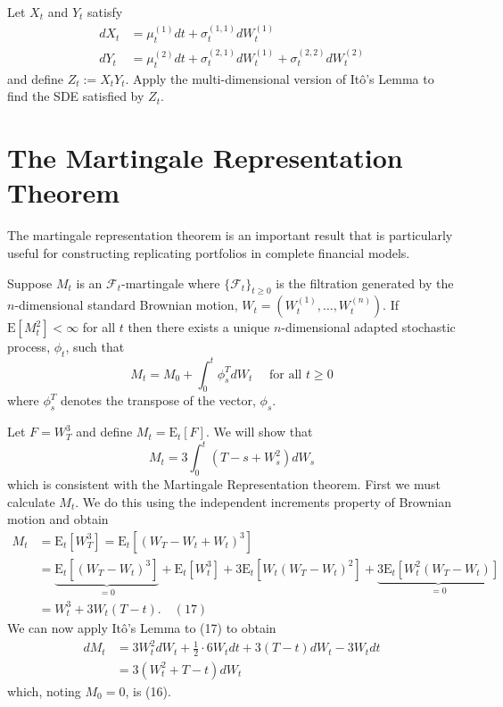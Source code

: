 \begin{example}
Let $X_t$ and $Y_t$ satisfy
\begin{align*}
dX_t &= \mu^{(1)}_t dt + \sigma^{(1,1)}_t dW^{(1)}_t \\
dY_t &= \mu^{(2)}_t dt + \sigma^{(2,1)}_t dW^{(1)}_t + \sigma^{(2,2)}_t dW^{(2)}_t
\end{align*}
and define $Z_t:=X_t Y_t$. Apply the multi-dimensional version of It\^o's Lemma to find the SDE satisfied by $Z_t$.
\end{example}

\section{The Martingale Representation Theorem}
The martingale representation theorem is an important result that is particularly useful for constructing replicating portfolios in complete financial models.

\begin{theorem}
Suppose $M_t$ is an $\mathcal{F}_t$-martingale where $\{\mathcal{F}_t\}_{t\geq 0}$ is the filtration generated by the $n$-dimensional standard Brownian motion, $W_t=(W^{(1)}_t,\ldots,W^{(n)}_t)$. If $\mathrm{E}[M_t^2]<\infty$ for all $t$ then there exists a unique $n$-dimensional adapted stochastic process, $\phi_t$, such that
\[M_t = M_0 + \int_0^t \phi_s^T dW_t \quad \text{ for all } t\geq 0\]
where $\phi_s^T$ denotes the transpose of the vector, $\phi_s$.
\end{theorem}

\begin{example}
Let $F=W_T^3$ and define $M_t=\mathrm{E}_t[F]$. We will show that
\[M_t = 3\int_0^t (T-s+W_s^2) dW_s \tag{16}\]
which is consistent with the Martingale Representation theorem. First we must calculate $M_t$. We do this using the independent increments property of Brownian motion and obtain
\begin{align*}
M_t &= \mathrm{E}_t[W_T^3] = \mathrm{E}_t[(W_T-W_t+W_t)^3] \\
&= \underbrace{\mathrm{E}_t[(W_T-W_t)^3]}_{=0} + \mathrm{E}_t[W_t^3] + 3\mathrm{E}_t[W_t(W_T-W_t)^2] + \underbrace{3\mathrm{E}_t[W_t^2(W_T-W_t)]}_{=0} \\
&= W_t^3 + 3W_t(T-t). \quad(17)
\end{align*}
We can now apply It\^o's Lemma to (17) to obtain
\begin{align*}
dM_t &= 3W_t^2 dW_t + \frac{1}{2} \cdot 6W_t dt + 3(T-t) dW_t - 3W_t dt \\
&= 3(W_t^2+T-t) dW_t
\end{align*}
which, noting $M_0=0$, is (16).
\end{example}


